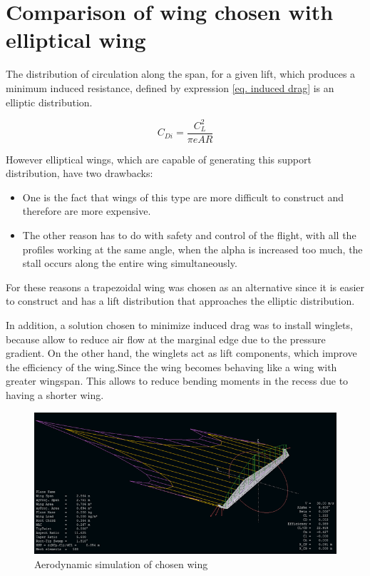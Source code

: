 \documentclass[english,fira]{ist-report}
\begin{document}
\section{Comparison of wing chosen with elliptical wing}

The distribution of circulation along the span, for a given lift, which produces a minimum induced resistance, defined by expression \ref{eq. induced drag} is an elliptic distribution.

\begin{equation}
    C_{Di} = \frac{C_{L}^2}{\pi e AR}
    \label{eq. induced drag}
\end{equation}

However elliptical wings, which are capable of generating this support distribution, have two drawbacks:

\begin{itemize}
	\item One is the fact that wings of this type are more difficult to construct and therefore are more expensive.
	\item The other reason has to do with safety and control of the flight, with all the profiles working at the same angle, when the alpha is increased too much, the stall occurs along the entire wing simultaneously.
\end{itemize}

For these reasons a trapezoidal wing was chosen as an alternative since it is easier to construct and has a lift distribution that approaches the elliptic distribution. 

In addition, a solution chosen to minimize induced drag was to install winglets, because allow to reduce air flow at the marginal edge due to the pressure gradient. On the other hand, the winglets act as lift components, which improve the efficiency of the wing.Since the wing becomes behaving like a wing with greater wingspan. This allows to reduce bending moments in the recess due to having a shorter wing.

\begin{figure}[!ht]
	\centering
	\includegraphics[width = 0.65\linewidth]{graphics/Aero_simulation_wing_chosen.png}
	\caption{Aerodynamic simulation of chosen wing}
	\label{fig:simulation_chosen_wing}
\end{figure}
\end{document}
